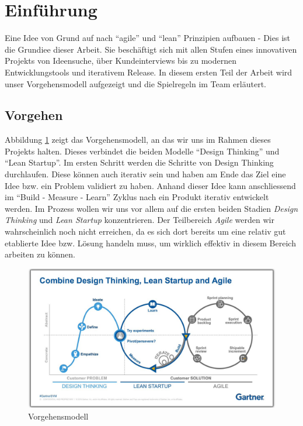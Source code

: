 \section{Einführung}

Eine Idee von Grund auf nach ``agile'' und ``lean'' Prinzipien aufbauen - Dies ist die Grundiee dieser Arbeit. Sie beschäftigt sich mit allen Stufen eines innovativen Projekts von Ideensuche, über Kundeinterviews bis zu modernen Entwicklungstools und iterativem Release. In diesem ersten Teil der Arbeit wird unser Vorgehensmodell aufgezeigt und die Spielregeln im Team erläutert.

\subsection{Vorgehen}
Abbildung \ref{fig:vorgehen} zeigt das Vorgehensmodell, an das wir uns im Rahmen dieses Projekts halten. Dieses verbindet die beiden Modelle ``Design Thinking'' und ``Lean Startup''. Im ersten Schritt werden die Schritte von Design Thinking durchlaufen. Diese können auch iterativ sein und haben am Ende das Ziel eine Idee bzw. ein Problem validiert zu haben. Anhand dieser Idee kann anschliessend im ``Build - Measure - Learn'' Zyklus nach \citet{ries2014lean} ein Produkt iterativ entwickelt werden. Im Prozess wollen wir uns vor allem auf die ersten beiden Stadien \textit{Design Thinking} und \textit{Lean Startup} konzentrieren. Der Teilbereich \textit{Agile} werden wir wahrscheinlich noch nicht erreichen, da es sich dort bereits um eine relativ gut etablierte Idee bzw. Lösung handeln muss, um wirklich effektiv in diesem Bereich arbeiten zu können.

\begin{figure}[H]
    \centering
    \includegraphics[width=\textwidth]{images/LeanStartup.png}
    \caption{Vorgehensmodell}
    \label{fig:vorgehen}
\end{figure}

